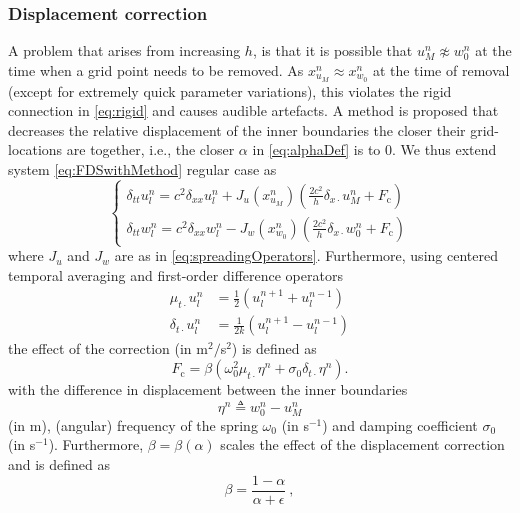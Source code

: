 \subsubsection{Displacement correction}\label{sec:dispCorr}
A problem that arises from increasing $h$, is that it is possible that $u_M^n \not\approx w_0^n$ at the time when a grid point needs to be removed. As $x_{u_M}^n \approx x_{w_0}^n$ at the time of removal (except for extremely quick parameter variations), this violates the rigid connection in \eqref{eq:rigid} and causes audible artefacts. A method is proposed that decreases the relative displacement of the inner boundaries the closer their grid-locations are together, i.e., the closer $\alpha$ in \eqref{eq:alphaDef} is to 0. We thus extend system \eqref{eq:FDSwithMethod} regular case as
\begin{equation}\label{eq:sysDispCorr}
\begin{cases}
    \delta_{tt}u_l^n = c^2\delta_{xx}u_l^n+ J_u(x_{u_M}^n)\left(\frac{2c^2}{h}\delta_{x\cdot}u_M^n + F_\text{c}\right)\\
    \delta_{tt}w_l^n = c^2\delta_{xx}w_l^n - J_w(x_{w_0}^n)\left(\frac{2c^2}{h}\delta_{x\cdot}w_0^n+F_\text{c}\right)
\end{cases}
\end{equation}
where $J_u$ and $J_w$ are as in \eqref{eq:spreadingOperators}. Furthermore, using centered temporal averaging and first-order difference operators
\begin{align}\label{eq:centeredAverage}
    \mu_{t\cdot}u_l^n &= \frac{1}{2} \left(u_l^{n+1} + u_l^{n-1}\right)\\
    \delta_{t\cdot}u_l^n &= \frac{1}{2k} \left(u_l^{n+1} - u_l^{n-1}\right)
\end{align}
the effect of the correction (in m$^2/$s$^2$) is defined as
\begin{equation}\label{eq:dispCorrForce}
    F_\text{c} = \beta \left(\omega_0^2\mu_{t\cdot}\eta^n +\sigma_0\delta_{t\cdot}\eta^n \right).
\end{equation}
with the difference in displacement between the inner boundaries
\begin{equation}
    \eta^n \triangleq w_0^n - u_M^n 
\end{equation}
(in m), (angular) frequency of the spring $\omega_0$ (in s$^{-1}$) and damping coefficient $\sigma_0$ (in s$^{-1}$). Furthermore, $\beta = \beta(\alpha)$ scales the effect of the displacement correction and is defined as
\begin{equation}\label{eq:betaDef}
    \beta = \frac{1-\alpha}{\alpha + \epsilon}\ ,
\end{equation}
